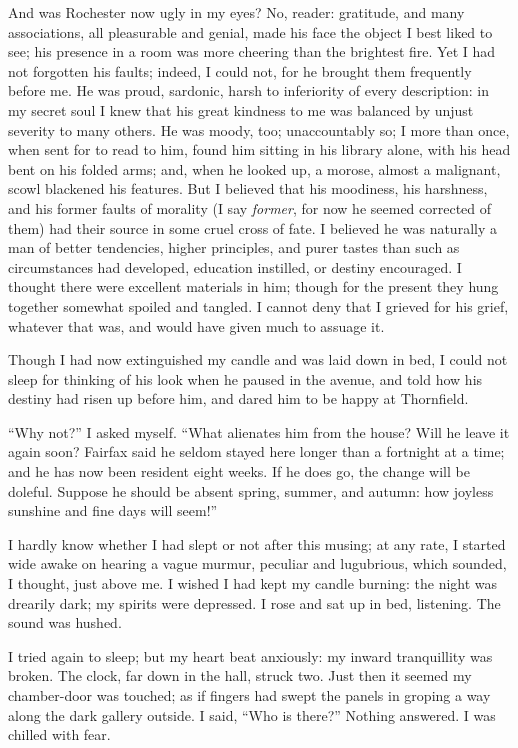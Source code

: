 And was \Mr{}  Rochester now ugly in my eyes? No, reader: gratitude, and
many associations, all pleasurable and genial, made his face the object
I best liked to see; his presence in a room was more cheering than the
brightest fire. Yet I had not forgotten his faults; indeed, I could
not, for he brought them frequently before me. He was proud, sardonic,
harsh to inferiority of every description: in my secret soul I knew that
his great kindness to me was balanced by unjust severity to many
others. He was moody, too; unaccountably so; I more than once, when
sent for to read to him, found him sitting in his library alone, with
his head bent on his folded arms; and, when he looked up, a morose,
almost a malignant, scowl blackened his features. But I believed that
his moodiness, his harshness, and his former faults of morality (I say
\emph{former}, for now he seemed corrected of them) had their source in
some cruel cross of fate. I believed he was naturally a man of better
tendencies, higher principles, and purer tastes than such as
circumstances had developed, education instilled, or destiny
encouraged. I thought there were excellent materials in him; though for
the present they hung together somewhat spoiled and tangled. I cannot
deny that I grieved for his grief, whatever that was, and would have
given much to assuage it.

Though I had now extinguished my candle and was laid down in bed, I
could not sleep for thinking of his look when he paused in the avenue,
and told how his destiny had risen up before him, and dared him to be
happy at Thornfield.

\enquote{Why not?} I asked myself. \enquote{What alienates him from the
house? Will he leave it again soon? \Mrs{} Fairfax said he seldom stayed
here longer than a fortnight at a time; and he has now been resident
eight weeks. If he does go, the change will be doleful. Suppose he
should be absent spring, summer, and autumn: how joyless sunshine and
fine days will seem!}

I hardly know whether I had slept or not after this musing; at any rate,
I started wide awake on hearing a vague murmur, peculiar and lugubrious,
which sounded, I thought, just above me. I wished I had kept my candle
burning: the night was drearily dark; my spirits were depressed. I rose
and sat up in bed, listening. The sound was hushed.

I tried again to sleep; but my heart beat anxiously: my inward
tranquillity was broken. The clock, far down in the hall, struck two. 
Just then it seemed my chamber-door was touched; as if fingers had swept
the panels in groping a way along the dark gallery outside. I said,
\enquote{Who is there?} Nothing answered. I was chilled with fear.


